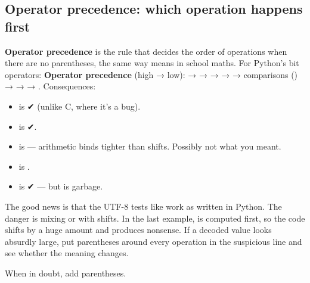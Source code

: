 \documentclass[10pt,a4paper]{article}
\begin{document}
\subsection{Operator precedence: which operation happens first}
\textbf{Operator precedence} is the rule that decides the order of operations when there are no parentheses, the same way  means  in school maths. For Python’s bit operators:
\textbf{Operator precedence} (high → low): \code{+\ -} → \code{\textless{}\allowbreak{}\textless{}\allowbreak{}\ \textgreater{}\allowbreak{}\textgreater{}\allowbreak{}} → \code{\&\allowbreak{}} → \code{\textasciicircum{}} → \code{\textbar{}\allowbreak{}} → comparisons () →  →  → . Consequences:
\begin{itemize}
\item {} is  ✔ (unlike C, where it’s a bug).
\item {} is  ✔.
\item {} is  — arithmetic binds tighter than shifts. Possibly not what you meant.
\item {} is .
\item {} is  ✔ — but  is garbage.
\end{itemize}
The good news is that the UTF-8 tests like  work as written in Python. The danger is mixing \code{+} or \code{-} with shifts. In the last example,  is computed first, so the code shifts by a huge amount and produces nonsense. If a decoded value looks absurdly large, put parentheses around every operation in the suspicious line and see whether the meaning changes.
\begin{tipbox}
When in doubt, add parentheses.
\end{tipbox}
\setcounter{section}{3}
\end{document}
